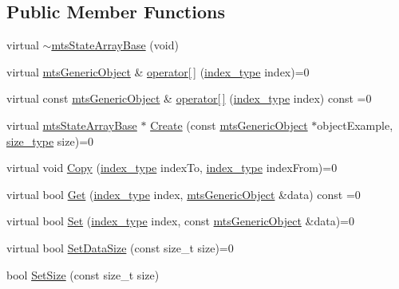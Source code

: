 \subsection*{Public Member Functions}
\begin{DoxyCompactItemize}
\item 
virtual \hyperlink{classmts_state_array_base_af6d2d84f3e93345b75c271e25a8d780a}{$\sim$mts\-State\-Array\-Base} (void)
\item 
virtual \hyperlink{classmts_generic_object}{mts\-Generic\-Object} \& \hyperlink{classmts_state_array_base_aa1da8c13184f5ebc5103e372d4a65ab5}{operator\mbox{[}$\,$\mbox{]}} (\hyperlink{classmts_state_array_base_a22ecbf65a907a7550951d12970f3df1d}{index\-\_\-type} index)=0
\item 
virtual const \hyperlink{classmts_generic_object}{mts\-Generic\-Object} \& \hyperlink{classmts_state_array_base_a7d8819d496a67a85e5288e5a4e1491a4}{operator\mbox{[}$\,$\mbox{]}} (\hyperlink{classmts_state_array_base_a22ecbf65a907a7550951d12970f3df1d}{index\-\_\-type} index) const =0
\item 
virtual \hyperlink{classmts_state_array_base}{mts\-State\-Array\-Base} $\ast$ \hyperlink{classmts_state_array_base_aedac123668b3ea43e5424de91bf2e03e}{Create} (const \hyperlink{classmts_generic_object}{mts\-Generic\-Object} $\ast$object\-Example, \hyperlink{classmts_state_array_base_a2a29f8b24a48620f67c907fc5592fc17}{size\-\_\-type} size)=0
\item 
virtual void \hyperlink{classmts_state_array_base_a257fc51f0fbe520338b6c6f301a9915f}{Copy} (\hyperlink{classmts_state_array_base_a22ecbf65a907a7550951d12970f3df1d}{index\-\_\-type} index\-To, \hyperlink{classmts_state_array_base_a22ecbf65a907a7550951d12970f3df1d}{index\-\_\-type} index\-From)=0
\item 
virtual bool \hyperlink{classmts_state_array_base_af325b729f2cd0e98372e5a3470734dc9}{Get} (\hyperlink{classmts_state_array_base_a22ecbf65a907a7550951d12970f3df1d}{index\-\_\-type} index, \hyperlink{classmts_generic_object}{mts\-Generic\-Object} \&data) const =0
\item 
virtual bool \hyperlink{classmts_state_array_base_a11b367be89abbbb96ed506764d0e676d}{Set} (\hyperlink{classmts_state_array_base_a22ecbf65a907a7550951d12970f3df1d}{index\-\_\-type} index, const \hyperlink{classmts_generic_object}{mts\-Generic\-Object} \&data)=0
\item 
virtual bool \hyperlink{classmts_state_array_base_a7a1ebd2697cdf0f4c709816a496ca3a8}{Set\-Data\-Size} (const size\-\_\-t size)=0
\item 
bool \hyperlink{classmts_state_array_base_ab4d09a9e4d7f6aa3d8703c1ce57b1b48}{Set\-Size} (const size\-\_\-t size)
\end{DoxyCompactItemize}
